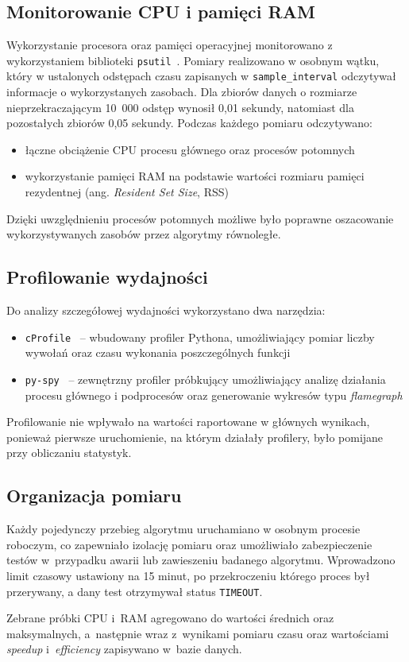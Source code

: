 \subsection*{Monitorowanie CPU i pamięci RAM}

Wykorzystanie procesora oraz pamięci operacyjnej monitorowano z wykorzystaniem biblioteki \texttt{psutil}~\cite{bib:Psutil}. 
Pomiary realizowano w osobnym wątku, który w ustalonych odstępach czasu zapisanych w \texttt{sample\_interval} 
odczytywał informacje o wykorzystanych zasobach.
Dla zbiorów danych o rozmiarze nieprzekraczającym 10~000 odstęp wynosił 0,01 sekundy, natomiast dla pozostałych zbiorów 0,05 sekundy.
Podczas każdego pomiaru odczytywano:
\begin{itemize}
    \item łączne obciążenie CPU procesu głównego oraz procesów potomnych
    \item wykorzystanie pamięci RAM na podstawie wartości rozmiaru pamięci rezydentnej (ang. \textit{Resident Set Size}, RSS)
\end{itemize}

Dzięki uwzględnieniu procesów potomnych możliwe było poprawne oszacowanie wykorzystywanych zasobów przez algorytmy równoległe.

\subsection*{Profilowanie wydajności}

Do analizy szczegółowej wydajności wykorzystano dwa narzędzia:

\begin{itemize}
    \item \texttt{cProfile}~\cite{bib:cProfile} -- wbudowany profiler Pythona, 
    umożliwiający pomiar liczby wywołań oraz czasu wykonania poszczególnych funkcji
    
    \item \texttt{py-spy}~\cite{bib:PySpy} -- zewnętrzny profiler próbkujący umożliwiający analizę 
    działania procesu głównego i podprocesów oraz generowanie wykresów typu \textit{flamegraph}
\end{itemize}

Profilowanie nie wpływało na wartości raportowane w głównych wynikach, ponieważ pierwsze uruchomienie, 
na którym działały profilery, było pomijane przy obliczaniu statystyk.

\subsection*{Organizacja pomiaru}

Każdy pojedynczy przebieg algorytmu uruchamiano w osobnym procesie roboczym, co zapewniało izolację pomiaru oraz 
umożliwiało zabezpieczenie testów w~przypadku awarii lub zawieszeniu badanego algorytmu.
Wprowadzono limit czasowy ustawiony na 15 minut, po przekroczeniu którego proces był przerywany, a dany test otrzymywał status \texttt{TIMEOUT}.

Zebrane próbki CPU i~RAM agregowano do wartości średnich oraz maksymalnych, 
a~następnie wraz z~wynikami pomiaru czasu oraz wartościami \textit{speedup} i~\textit{efficiency} zapisywano w~bazie danych.